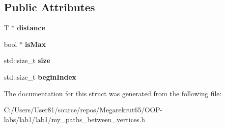 \subsection*{Public Attributes}
\begin{DoxyCompactItemize}
\item 
\mbox{\label{structpbv_1_1_paths_between_vertices_a67aed042aa649d2b6dfeee29d3ec6416}} 
T $\ast$ {\bfseries distance}
\item 
\mbox{\label{structpbv_1_1_paths_between_vertices_a8d7391a03771f17ca699f519e64bf2a4}} 
bool $\ast$ {\bfseries is\+Max}
\item 
\mbox{\label{structpbv_1_1_paths_between_vertices_a7ffee986b1b7f57a881a883b58bc67f4}} 
std\+::size\+\_\+t {\bfseries size}
\item 
\mbox{\label{structpbv_1_1_paths_between_vertices_abf43c3771ed161bb80a73fe39e5cc916}} 
std\+::size\+\_\+t {\bfseries begin\+Index}
\end{DoxyCompactItemize}


The documentation for this struct was generated from the following file\+:\begin{DoxyCompactItemize}
\item 
C\+:/\+Users/\+User81/source/repos/\+Megarekrut65/\+O\+O\+P-\/labs/lab1/lab1/my\+\_\+paths\+\_\+between\+\_\+vertices.\+h\end{DoxyCompactItemize}
